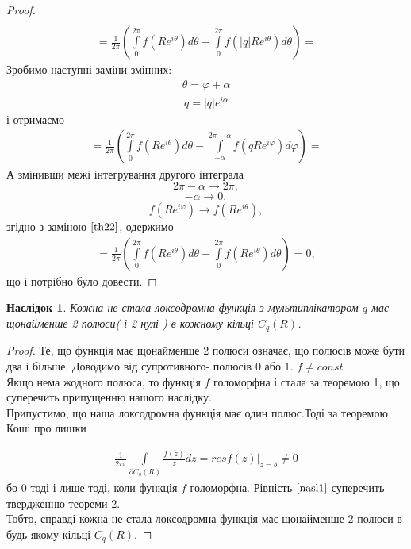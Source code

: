 \documentclass[12pt,a4paper]{article}
\begin{document}
\begin{proof}
\[\begin{array}{l}
\end{array} \] 
\[\begin{array}{l}
= \frac{1}{2\pi}(\int\limits_{0}^{2\pi} f(Re^{i\theta})d\theta  - \int\limits_{0}^{2\pi}f(\left |q \right |Re^{i\theta })d\theta) = 
\end{array} \]
Зробимо наступні заміни змінних:
\begin{equation}\label{th22}
\begin{array}{l}
\theta =\varphi +\alpha 
\end{array} 
\end{equation}
\[\begin{array}{l}
q=\left |q  \right |e^{i\alpha }
\end{array} \]
і отримаємо
\[\begin{array}{l}
= \frac{1}{2\pi}(\int\limits_{0}^{2\pi} f(Re^{i\theta})d\theta  - \int\limits_{-\alpha}^{2\pi-\alpha}f(qRe^{i\varphi })d\varphi)=
\end{array} \]
А змінивши межі інтегрування другого інтеграла\\
 $$2\pi-\alpha\longrightarrow 2\pi ,$$ 
 $$ -\alpha\longrightarrow 0 ,$$
  $$f(Re^{i\varphi}) \longrightarrow f(Re^{i\theta}) ,$$ згідно з заміною $\eqref {th22} $, одержимо
\[\begin{array}{l}
=\frac{1}{2\pi}(\int\limits_{0}^{2\pi} f(Re^{i\theta})d\theta - \int\limits_{0}^{2\pi}f(Re^{i\theta })d\theta)=0,
\end{array}\]
що і потрібно було довести.
\end{proof}
\vspace{1,5cm}

\newtheorem{nasl}{Наслідок}
\begin{nasl}
 Кожна не стала локсодромна функція з мультиплікатором $q$ має щонайменше 2 полюси( і 2 нулі ) в кожному кільці $C_{q}(R)$.
\end{nasl}
\begin{proof}
Те, що функція має щонайменше 2 полюси означає, що полюсів може бути два і більше. Доводимо від супротивного- полюсів $0$ або $1$. $ f \neq const $\\
Якщо нема жодного полюса, то функція $f$ голоморфна і стала за теоремою 1, що суперечить припущенню нашого наслідку. \\
Припустимо, що наша локсодромна функція має один полюс.Тоді за теоремою Коші про лишки

\begin{equation}\label{nasl1}
\begin{array}{l}
\frac{1}{2i\pi}\int\limits_{\partial C_{q}(R)}^{ } \frac{f(z)}{z}dz= resf(z)\big\vert_{z=b} \neq 0 
\end{array} 
\end{equation}
бо $0$ тоді і лише тоді, коли функція $f$ голоморфна. Рівність
$\eqref {nasl1} $ суперечить твердженню теореми 2. \\
Тобто, справді кожна не стала локсодромна функція має щонайменше 2 полюси в будь-якому кільці $C_{q}(R)$.
\end{proof}
\vspace{1,5cm}
\end{document}
